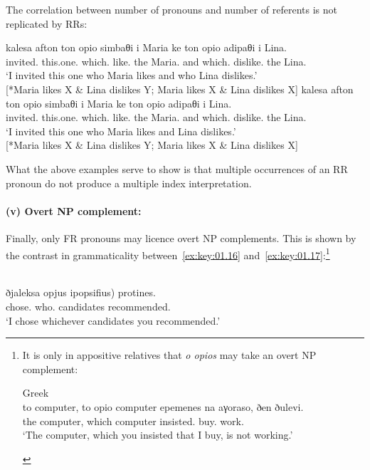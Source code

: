 \documentclass[output=paper]{langsci/langscibook}
\begin{document}
The correlation between number of pronouns and number of referents is not
replicated by \glspl{RR}:

\ea {}\label{ex:key:01.15}
	\ea
		\gll kalesa afton {ton opio} simbaθi i Maria ke {ton opio} adipaθi i Lina.\\
			invited.\Fsg{} this.one.\Acc{} which.\Acc{} like.\Tsg{} the Maria.\Nom{} and  which.\Acc{} dislike.\Tsg{} the Lina.\Nom{}\\
		\glt \enquote*{I invited this one who Maria likes and who Lina dislikes.}\\
        {}[*Maria likes X \& Lina dislikes Y;  Maria likes X \& Lina dislikes X]
	\ex
		\gll kalesa afton {ton opio} simbaθi i Maria ke {ton opio} adipaθi i Lina.\\
			invited.\Fsg{} this.one.\Acc{} which.\Acc{} like.\Tsg{} the Maria.\Nom{} and  which.\Acc{} dislike.\Tsg{} the Lina.\Nom{}\\
		\glt \enquote*{I invited this one who Maria likes and Lina dislikes.}\\
        {}[*Maria likes X \& Lina dislikes Y;  Maria likes X \& Lina dislikes X]
	\z
\z

What the above examples serve to show is that multiple occurrences of an
\gls{RR} pronoun do not produce a multiple index interpretation.

\paragraph*{(v) Overt NP complement:} Finally, only \gls{FR} pronouns may
licence overt NP complements. This is shown by the contrast in grammaticality
between~\eqref{ex:key:01.16} and~\eqref{ex:key:01.17}:\footnote{It is only in
    appositive relatives that \emph{o opios} may take an overt NP complement:

\begin{exe}
     Greek\\
	\gll to computer, {to opio} computer epemenes na aγoraso, ðen ðulevi.\\
		the computer, which computer insisted.\Ssg{} \Sbjv{} buy.\Fsg{} \Neg{} work.\Tsg{}\\
	\glt \enquote*{The computer, which you insisted that I buy, is not working.}
\end{exe}
}

\ea {}\label{ex:key:01.16}\\
    \gll ðjaleksa opjus \llap{(}ipopsifius) protines.\\
		chose.\Fsg{} who.\Acc{} candidates recommended.\Ssg{}\\
	\glt \enquote*{I chose whichever candidates you recommended.}
\z\newpage
\end{document}
